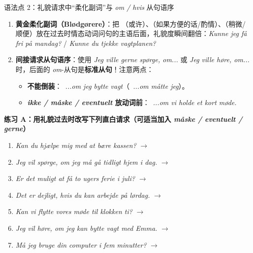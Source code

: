 \begin{grammatikbox}{语法点 2：礼貌请求中“柔化副词”与 \textit{om / hvis} 从句语序}
\begin{enumerate}
  \item \textbf{黄金柔化副词（Blødgørere）}：把 （或许）、（如果方便的话/酌情）、（稍微/顺便）放在过去时情态动词问句的主语后面，礼貌度瞬间翻倍：\textit{Kunne jeg  få fri på mandag?} / \textit{Kunne du  tjekke vagtplanen?}
  \item \textbf{间接请求从句语序}：使用 \textit{Jeg ville gerne spørge, om...} 或 \textit{Jeg ville høre, om...} 时，后面的 \textit{om}-从句是\textbf{标准从句}！注意两点：
    \begin{itemize}
      \item \textbf{不能倒装}：\ \textit{...om jeg  bytte vagt}（\ \textit{...om måtte jeg}）。
      \item \textbf{\textit{ikke / måske / eventuelt} 放动词前}：\ \textit{...om vi  holde et kort møde.}
    \end{itemize}
\end{enumerate}
\end{grammatikbox}


\textbf{练习 A：用礼貌过去时改写下列直白请求（可适当加入 \textit{måske / eventuelt / gerne}）}
\begin{enumerate}
  \item \textit{Kan du hjælpe mig med at bære kassen?} $\rightarrow$
  \item \textit{Jeg vil spørge, om jeg må gå tidligt hjem i dag.} $\rightarrow$
  \item \textit{Er det muligt at få to ugers ferie i juli?} $\rightarrow$
  \item \textit{Det er dejligt, hvis du kan arbejde på lørdag.} $\rightarrow$
  \item \textit{Kan vi flytte vores møde til klokken ti?} $\rightarrow$
  \item \textit{Jeg vil høre, om jeg kan bytte vagt med Emma.} $\rightarrow$
  \item \textit{Må jeg bruge din computer i fem minutter?} $\rightarrow$
\end{enumerate}

